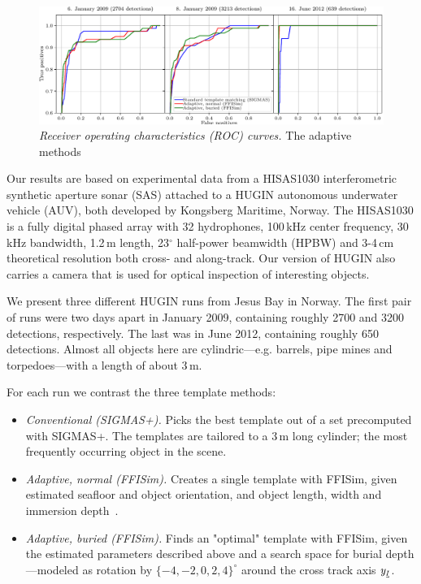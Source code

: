 \begin{figure}[t]\centering%
\includegraphics[width=\linewidth]{gfx/fig_rocs.pdf}%
\caption{\emph{Receiver operating characteristics (ROC) curves.} The adaptive methods }\label{IV_fig_roc_curves}%
\end{figure}

Our results are based on experimental data from a HISAS1030 interferometric synthetic aperture sonar (SAS) attached to a HUGIN autonomous underwater vehicle (AUV), both developed by Kongsberg Maritime, Norway. The HISAS1030 is a fully digital phased array with 32 hydrophones, 100\,kHz center frequency, 30\,kHz bandwidth, 1.2\,m length, 23$^\circ$ half-power beamwidth (HPBW) and 3-4\,cm theoretical resolution both cross- and along-track. Our version of HUGIN also carries a camera that is used for optical inspection of interesting objects.


We present three different HUGIN runs from Jesus Bay in Norway. The first pair of runs were two days apart in January 2009, containing roughly 2700 and 3200 detections, respectively. The last was in June 2012, containing roughly 650 detections. Almost all objects here are cylindric---e.g. barrels, pipe mines and torpedoes---with a length of about 3\,m.

For each run we contrast the three template methods:
%
\begin{itemize}
\item \emph{Conventional (SIGMAS+).} Picks the best template out of a set precomputed with SIGMAS+. The templates are tailored to a 3\,m long cylinder; the most frequently occurring object in the scene.
\item \emph{Adaptive, normal (FFISim).} Creates a single template with FFISim, given estimated seafloor and object orientation, and object length, width and immersion depth~\cite{Midelfart2010}. 
\item \emph{Adaptive, buried (FFISim).} Finds an "optimal" template with FFISim, given the estimated parameters described above and a search space for burial depth---modeled as rotation by $\{-4,-2,0,2,4\}^\circ$ around the cross track axis $y_\textrm{\tiny$\uvec{I}$}$.
\end{itemize}

